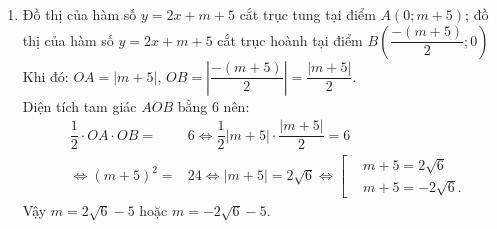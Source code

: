 \begin{ex}
{\begin{enumerate}
\begin{eqnarray*}
		&\Leftrightarrow &\left\{\begin{aligned}&24a+24b=3\\& 12a+24b=2\end{aligned}\right.\Leftrightarrow \left\{\begin{aligned}&a=\dfrac{1}{12}\\			&b=\dfrac{1}{24}.\end{aligned}\right.
		\end{eqnarray*}
	Từ đó suy ra $\left\{\begin{aligned}& \dfrac{1}{x}=\dfrac{1}{12}\\& \dfrac{1}{y}=\dfrac{1}{24}\end{aligned}\right.\Leftrightarrow \left\{\begin{aligned}&x=12\\&y=24\end{aligned}\right.$ (thoả mãn).\\
	Vậy thời gian người thứ nhất làm riêng một mình xong công việc là $12$ (giờ), thời gian người thứ hai làm riêng một mình xong công việc là $24$ (giờ).	
		\item Đồ thị của hàm số $y=2x+m+5$ cắt trục tung tại điểm $A(0;m+5)$; đồ thị của hàm số $y=2x+m+5$ cắt trục hoành tại điểm $B\left(\dfrac{-\left(m+5\right)}{2};0\right)$\\
		Khi đó: $OA=\left|m+5\right|$, $OB=\left| \dfrac{-\left(m+5\right)}{2}\right|=\dfrac{\left| m+5\right|}{2}$.\\
		Diện tích tam giác $AOB$ bằng $6$ nên:
		\begin{eqnarray*}
		&\dfrac{1}{2}\cdot OA\cdot OB=&6\Leftrightarrow \dfrac{1}{2}\left| m+5\right|\cdot \dfrac{\left| m+5\right|}{2}=6\\
		&\Leftrightarrow {\left(m+5\right)}^2=&24\Leftrightarrow \left| m+5\right|=2\sqrt{6}\Leftrightarrow \left[\begin{aligned}&m+5=2\sqrt{6}\\&m+5=-2\sqrt{6}.\end{aligned}\right.
		\end{eqnarray*}
		Vậy $m=2\sqrt{6}-5$ hoặc $m=-2\sqrt{6}-5$.
		\end{enumerate}
}
\end{ex}
